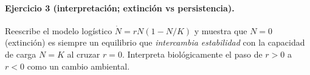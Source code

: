 \paragraph{Ejercicio 3 (interpretación; extinción vs persistencia).} Reescribe el modelo logístico $\dot{N}=rN(1-N/K)$ y muestra que $N=0$ (extinción) es siempre un equilibrio que \emph{intercambia estabilidad} con la capacidad de carga $N=K$ al cruzar $r=0$. Interpreta biológicamente el paso de $r>0$ a $r<0$ como un cambio ambiental.


